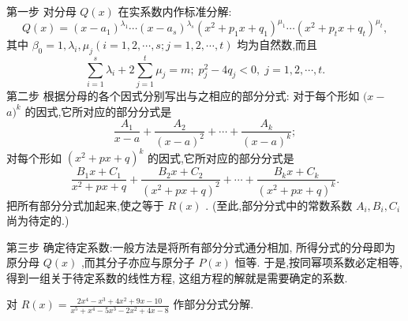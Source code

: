 第一步 对分母 \(Q\left( x\right)\) 在实系数内作标准分解:
\[
Q\left( x\right)  = {\left( x - {a}_{1}\right) }^{{\lambda }_{1}}\cdots {\left( x - {a}_{s}\right) }^{{\lambda }_{s}}{\left( {x}^{2} + {p}_{1}x + {q}_{1}\right) }^{{\mu }_{1}}\cdots {\left( {x}^{2} + {p}_{t}x + {q}_{t}\right) }^{{\mu }_{t}}, \tag{2}
\]
其中 \({\beta }_{0} = 1,{\lambda }_{i},{\mu }_{j}\left( {i = 1,2,\cdots ,s;j = 1,2,\cdots ,t}\right)\) 均为自然数,而且
\[
\mathop{\sum }\limits_{{i = 1}}^{s}{\lambda }_{i} + 2\mathop{\sum }\limits_{{j = 1}}^{t}{\mu }_{j} = m;\;{p}_{j}^{2} - 4{q}_{j} < 0,\;j = 1,2,\cdots ,t.
\]
第二步 根据分母的各个因式分别写出与之相应的部分分式: 对于每个形如 \((x -\)  \(a{)}^{k}\) 的因式,它所对应的部分分式是
\[
\frac{{A}_{1}}{x - a} + \frac{{A}_{2}}{{\left( x - a\right) }^{2}} + \cdots  + \frac{{A}_{k}}{{\left( x - a\right) }^{k}};
\]
对每个形如 \({\left( {x}^{2} + px + q\right) }^{k}\) 的因式,它所对应的部分分式是
\[
\frac{{B}_{1}x + {C}_{1}}{{x}^{2} + {px} + q} + \frac{{B}_{2}x + {C}_{2}}{{\left( {x}^{2} + px + q\right) }^{2}} + \cdots  + \frac{{B}_{k}x + {C}_{k}}{{\left( {x}^{2} + px + q\right) }^{k}}.
\]
把所有部分分式加起来,使之等于 \(R\left( x\right)\) . (至此,部分分式中的常数系数 \({A}_{i},{B}_{i},{C}_{i}\) 尚为待定的.)

第三步 确定待定系数:一般方法是将所有部分分式通分相加, 所得分式的分母即为原分母 \(Q\left( x\right)\) ,而其分子亦应与原分子 \(P\left( x\right)\) 恒等. 于是,按同幂项系数必定相等, 得到一组关于待定系数的线性方程, 这组方程的解就是需要确定的系数.

\begin{example}

\end{example}
对 \(R\left( x\right)  = \frac{2{x}^{4} - {x}^{3} + 4{x}^{2} + {9x} - {10}}{{x}^{5} + {x}^{4} - 5{x}^{3} - 2{x}^{2} + {4x} - 8}\) 作部分分式分解.

